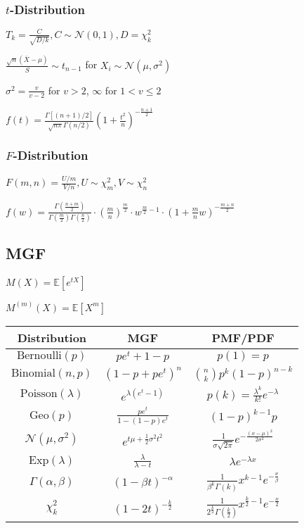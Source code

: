 \documentclass[9pt,landscape]{article}
\begin{document}
\begin{multicols}{3}
\subsubsection{$t$-Distribution}

$T_k = \frac{C}{\sqrt{D/k}}, C\sim\mathcal{N}(0, 1), D = \chi^2_k$

$\frac{\sqrt{n}(\overline{X}-\mu)}{S}\sim t_{n-1}$ for $X_i\sim \mathcal{N}(\mu, \sigma^2)$

$\sigma^2=\frac{v}{v-2}$ for $v>2$, $\infty$ for $1<v\le 2$

$f(t)=\frac{\Gamma[(n + 1) / 2]}{\sqrt{n\pi}\Gamma(n/2)}\left(1 + \frac{t^2}{n}\right)^{-\frac{n + 1}{2}}$

\subsubsection{$F$-Distribution}

$F(m, n) = \frac{U/m}{V/n}, U\sim\chi_m^2, V\sim \chi_n^2$

$f(w)=\frac{\Gamma\left(\frac{n+m}{2}\right)}{\Gamma\left(\frac{m}{2}\right)\Gamma\left(\frac{n}{2}\right)}\cdot\left(\frac{m}{n}\right)^{\frac{m}{2}}\cdot w^{\frac{m}{2}-1}\cdot\left(1+\frac{m}{n}w\right)^{-\frac{m+n}{2}}$

\subsection{MGF}

$M(X)=\mathbb{E}\left[e^{tX}\right]$

$M^{(m)}(X)=\mathbb{E}\left[X^m\right]$

\begin{tabular}{|c|c|c|}
\hline
\textbf{Distribution} & \textbf{MGF} & \textbf{PMF/PDF}\\ \hline
$\mathrm{Bernoulli}(p)$ & $pe^t + 1-p$ & $p(1)=p$ \\ \hline
$\mathrm{Binomial}(n, p)$ & $(1-p + pe^t)^n$&$\binom{n}{k}p^k(1-p)^{n-k}$\\ \hline
$\mathrm{Poisson}(\lambda)$ & $e^{\lambda(e^t - 1)}$ &$p(k)=\frac{\lambda^k}{k!}e^{-\lambda}$\\ \hline
$\mathrm{Geo}(p)$ & $\frac{pe^t}{1-(1-p)e^t}$ & $(1-p)^{k-1}p$ \\ \hline
$\mathcal{N}(\mu, \sigma^2)$ & $e^{t\mu + \frac{1}{2}\sigma^2 t^2}$ &$\frac{1}{\sigma\sqrt{2\pi}}e^{-\frac{(x-\mu)^2}{2\sigma^2}}$  \\ \hline
$\mathrm{Exp}(\lambda)$ & $\frac{\lambda}{\lambda - t}$ & $\lambda e^{-\lambda x}$ \\ \hline
$\Gamma(\alpha, \beta)$ & $(1 - \beta t)^{-\alpha}$ & $\frac{1}{\beta^k\Gamma(k)}x^{k-1}e^{-\frac{x}{\beta}}$ \\ \hline
$\chi^2_k$ & $(1 - 2t)^{-\frac{k}{2}}$ &$\frac{1}{2^{\frac{k}{2}}\Gamma\left(\frac{k}{2}\right)}x^{\frac{k}{2}-1}e^{-\frac{x}{2}}$\\ \hline
\end{tabular}


\end{multicols}
\end{document}
